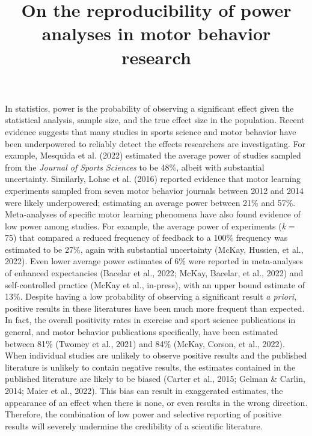 \documentclass[
  man, donotrepeattitle,mask,floatsintext]{apa7}
\title{On the reproducibility of power analyses in motor behavior research}
\author{\phantom{0}}
\date{}
\affiliation{\phantom{0}}
\begin{document}
\maketitle

In statistics, power is the probability of observing a significant effect given the statistical analysis, sample size, and the true effect size in the population. Recent evidence suggests that many studies in sports science and motor behavior have been underpowered to reliably detect the effects researchers are investigating. For example, Mesquida et al. (2022) estimated the average power of studies sampled from the \emph{Journal of Sports Sciences} to be 48\%, albeit with substantial uncertainty. Similarly, Lohse et al. (2016) reported evidence that motor learning experiments sampled from seven motor behavior journals between 2012 and 2014 were likely underpowered; estimating an average power between 21\% and 57\%. Meta-analyses of specific motor learning phenomena have also found evidence of low power among studies. For example, the average power of experiments (\emph{k} = 75) that compared a reduced frequency of feedback to a 100\% frequency was estimated to be 27\%, again with substantial uncertainty (McKay, Hussien, et al., 2022). Even lower average power estimates of 6\% were reported in meta-analyses of enhanced expectancies (Bacelar et al., 2022; McKay, Bacelar, et al., 2022) and self-controlled practice (McKay et al., in-press), with an upper bound estimate of 13\%. Despite having a low probability of observing a significant result \emph{a priori}, positive results in these literatures have been much more frequent than expected. In fact, the overall positivity rates in exercise and sport science publications in general, and motor behavior publications specifically, have been estimated between 81\% (Twomey et al., 2021) and 84\% (McKay, Corson, et al., 2022). When individual studies are unlikely to observe positive results and the published literature is unlikely to contain negative results, the estimates contained in the published literature are likely to be biased (Carter et al., 2015; Gelman \& Carlin, 2014; Maier et al., 2022). This bias can result in exaggerated estimates, the appearance of an effect when there is none, or even results in the wrong direction. Therefore, the combination of low power and selective reporting of positive results will severely undermine the credibility of a scientific literature.
\end{document}
